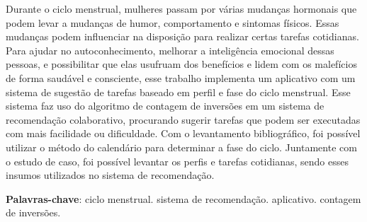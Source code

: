 \begin{resumo}

    Durante o ciclo menstrual, mulheres passam por várias mudanças hormonais que 
    podem levar a 
    mudanças de humor, comportamento e sintomas físicos. Essas mudanças podem influenciar na 
    disposição para realizar certas tarefas cotidianas. Para 
    ajudar no autoconhecimento, melhorar a inteligência emocional 
    dessas pessoas, e possibilitar que elas usufruam dos benefícios e lidem com os 
    malefícios 
    de forma saudável e consciente, esse trabalho implementa um aplicativo com um sistema de 
    sugestão de tarefas baseado em 
    perfil e fase do ciclo menstrual. Esse sistema faz uso do algoritmo de contagem de inversões
    em um sistema de recomendação colaborativo, procurando sugerir tarefas 
    que podem ser executadas com mais facilidade ou dificuldade. Com o levantamento bibliográfico, 
    foi possível utilizar o método do calendário para determinar a fase do ciclo. Juntamente com o 
    estudo de caso, foi possível levantar os perfis e tarefas cotidianas, 
    sendo esses insumos utilizados no sistema de recomendação.
    
     \vspace{\onelineskip}
        
     \noindent
     \textbf{Palavras-chave}: ciclo menstrual. sistema de recomendação. aplicativo. contagem de inversões.
    \end{resumo}
    